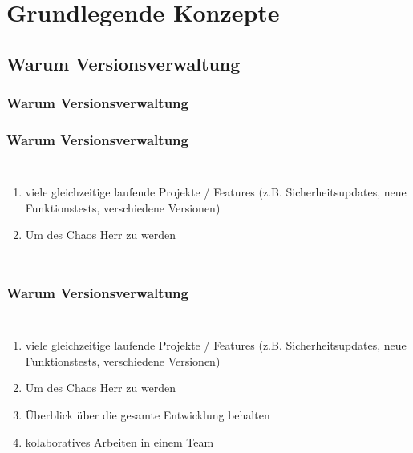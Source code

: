 \documentclass{beamer}
\begin{document}
\section{Grundlegende Konzepte} 
\subsection{Warum Versionsverwaltung}\frametitle{Warum Versionsverwaltung}

\begin{frame}\frametitle{Warum Versionsverwaltung}
\begin{columns}
                \begin{enumerate}
                \item viele gleichzeitige laufende Projekte / Features (z.B. Sicherheitsupdates, neue Funktionstests, verschiedene Versionen)
                \item Um des Chaos Herr zu werden
                \end{enumerate}
\end{columns}

\end{frame}
\begin{frame}\frametitle{Warum Versionsverwaltung}
\begin{columns}
                \begin{enumerate}
                \item viele gleichzeitige laufende Projekte / Features (z.B. Sicherheitsupdates, neue  Funktionstests, verschiedene Versionen)
                \item Um des Chaos Herr zu werden
                \item Überblick über die gesamte Entwicklung behalten
                \item kolaboratives Arbeiten in einem Team
                \end{enumerate}
\end{columns}
\end{frame}
\end{document}
